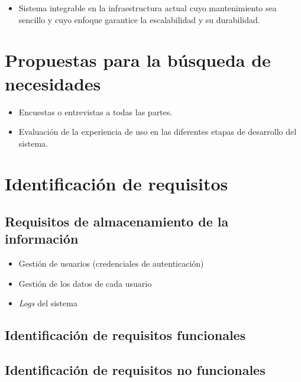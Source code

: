 \begin{itemize}
  \item Sistema integrable en la infraestructura actual cuyo mantenimiento sea sencillo y cuyo enfoque garantice la escalabilidad y su durabilidad.
\end{itemize}

\section{Propuestas para la búsqueda de necesidades}

\begin{itemize}
  \item Encuestas o entrevistas a todas las partes.
  \item Evaluación de la experiencia de uso en las diferentes etapas de desarrollo del sistema.
\end{itemize}

\section{Identificación de requisitos}

\subsection{Requisitos de almacenamiento de la información}

\begin{itemize}
  \item Gestión de usuarios (credenciales de autenticación)
  \item Gestión de los datos de cada usuario
  \item \textit{Logs} del sistema
\end{itemize}

\subsection{Identificación de requisitos funcionales}


\subsection{Identificación de requisitos no funcionales}

